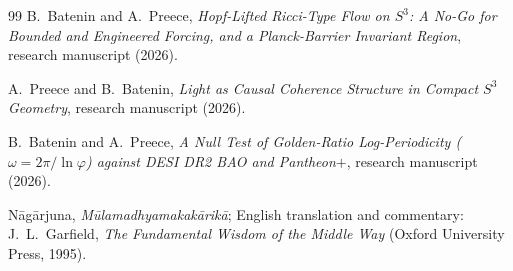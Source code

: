 \documentclass[11pt,a4paper]{article}
\theoremstyle{definition}
\theoremstyle{remark}
\newcommand{\Sthree}{S^{3}}
\begin{document}
\begin{thebibliography}{99}
B.~Batenin and A.~Preece, \emph{Hopf-Lifted Ricci-Type Flow on $\Sthree$: A No-Go for Bounded
and Engineered Forcing, and a Planck-Barrier Invariant Region}, research manuscript (2026).

A.~Preece and B.~Batenin, \emph{Light as Causal Coherence Structure in Compact $\Sthree$
Geometry}, research manuscript (2026).

B.~Batenin and A.~Preece, \emph{A Null Test of Golden-Ratio Log-Periodicity
($\omega=2\pi/\ln\varphi$) against DESI DR2 BAO and Pantheon$+$}, research manuscript (2026).

N\=ag\=arjuna, \emph{M\=ulamadhyamakak\=arik\=a}; English translation and commentary:
J.~L.~Garfield, \emph{The Fundamental Wisdom of the Middle Way} (Oxford University Press, 1995).

\end{thebibliography}
\end{document}
